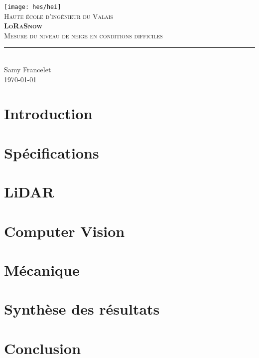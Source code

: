 \documentclass[11pt,titlepage]{report}
\begin{document}
\begin{titlepage}
	\centering
    \texttt{[image: hes/hei]}\\[1cm] 	%
    \textsc{\LARGE Haute école d'ingénieur du Valais}\\ \vspace{\fill}
	\textbf{\textsc{\fontsize{35}{35}\selectfont LoRaSnow}}\\ \vspace{\fill}
	\textsc{\LARGE Mesure du niveau de neige en conditions difficiles}\\[0.4cm]
	\rule{\linewidth}{0.2 mm} \\[0.5 cm]
	Samy Francelet \\
	\today
\end{titlepage}
\restoregeometry

\tableofcontents
\listoffigures
\listoftables
\pagestyle{fancy}

\chapter{Introduction}


\chapter{Spécifications}


\chapter{LiDAR}



\chapter{Computer Vision}




\chapter{Mécanique}


\chapter{Synthèse des résultats}


\chapter{Conclusion}


\setlength{\topmargin}{-2.2mm} %
\printbibliography[heading=bibintoc]
\end{document}
